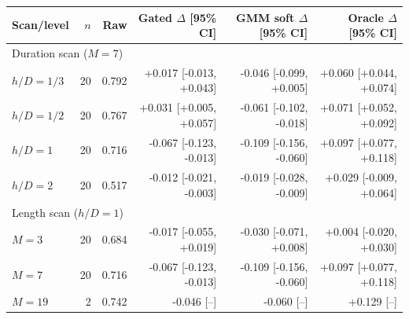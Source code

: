 \begin{tabular}{lrrrrr}
\toprule
Scan/level & $n$ & Raw & Gated $\Delta$ [95\% CI] & GMM soft $\Delta$ [95\% CI] & Oracle $\Delta$ [95\% CI] \\
\midrule
\multicolumn{6}{l}{Duration scan ($M=7$)} \\
$h/D=1/3$ & 20 & 0.792 & +0.017 [-0.013, +0.043] & -0.046 [-0.099, +0.005] & +0.060 [+0.044, +0.074] \\
$h/D=1/2$ & 20 & 0.767 & +0.031 [+0.005, +0.057] & -0.061 [-0.102, -0.018] & +0.071 [+0.052, +0.092] \\
$h/D=1$ & 20 & 0.716 & -0.067 [-0.123, -0.013] & -0.109 [-0.156, -0.060] & +0.097 [+0.077, +0.118] \\
$h/D=2$ & 20 & 0.517 & -0.012 [-0.021, -0.003] & -0.019 [-0.028, -0.009] & +0.029 [-0.009, +0.064] \\
\midrule
\multicolumn{6}{l}{Length scan ($h/D=1$)} \\
$M=3$ & 20 & 0.684 & -0.017 [-0.055, +0.019] & -0.030 [-0.071, +0.008] & +0.004 [-0.020, +0.030] \\
$M=7$ & 20 & 0.716 & -0.067 [-0.123, -0.013] & -0.109 [-0.156, -0.060] & +0.097 [+0.077, +0.118] \\
$M=19$ & 2 & 0.742 & -0.046 [--] & -0.060 [--] & +0.129 [--] \\
\bottomrule
\end{tabular}
